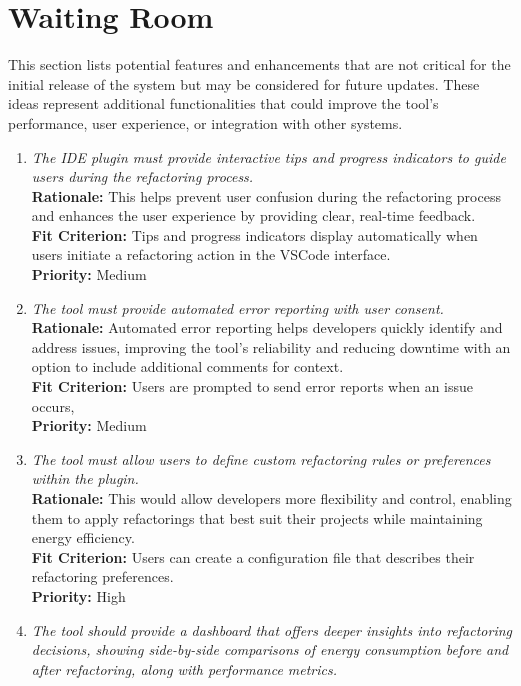 \documentclass[12pt]{article}
\begin{document}
\section{Waiting Room}

This section lists potential features and enhancements that are not critical for the initial release of the system but may be considered for future updates. These ideas represent additional functionalities that could improve the tool’s performance, user experience, or integration with other systems.

\begin{enumerate}[label=WTRM \arabic*., wide=0pt, leftmargin=*]
	\item \emph{The IDE plugin must provide interactive tips and progress indicators to guide users during the refactoring process.}\\
    {\bf Rationale:} This helps prevent user confusion during the refactoring process and enhances the user experience by providing clear, real-time feedback.\\
    {\bf Fit Criterion:} Tips and progress indicators display automatically when users initiate a refactoring action in the VSCode interface.\\
    {\bf Priority:} Medium
  \item \emph{The tool must provide automated error reporting with user consent.}\\
    {\bf Rationale:} Automated error reporting helps developers quickly identify and address issues, improving the tool's reliability and reducing downtime with an option to include additional comments for context.\\
    {\bf Fit Criterion:} Users are prompted to send error reports when an issue occurs, \\
    {\bf Priority:} Medium
  \item \emph{The tool must allow users to define custom refactoring rules or preferences within the plugin.}\\
    {\bf Rationale:} This would allow developers more flexibility and control, enabling them to apply refactorings that best suit their projects while maintaining energy efficiency.\\
    {\bf Fit Criterion:} Users can create a configuration file that describes their refactoring preferences.\\
    {\bf Priority:} High
  \item \emph{The tool should provide a dashboard that offers deeper insights into refactoring decisions, showing side-by-side comparisons of energy consumption before and after refactoring, along with performance metrics.}\\

\end{enumerate}
\end{document}

